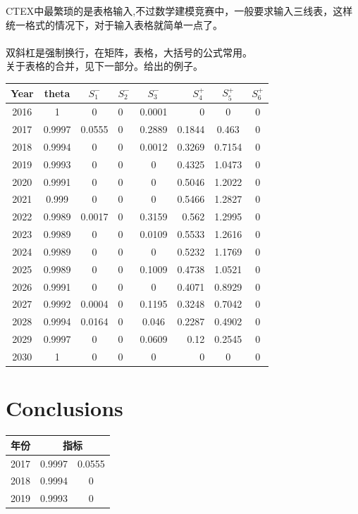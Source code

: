\documentclass{mcmthesis}
\begin{document}
CTEX中最繁琐的是表格输入,不过数学建模竞赛中，一般要求输入三线表，这样统一格式的情况下，对于输入表格就简单一点了。\\
\\
双斜杠是强制换行，在矩阵，表格，大括号的公式常用。\\
关于表格的合并，见下一部分。给出的例子。
\begin{center}
\begin{tabular}{c|cclcrcc}
\hline
Year & theta & $S_1^-$ & $S_2^-$ & $S_3^-$ & $S_4^+$ & $S_5^+$ & $S_6^+$ \\%
\hline
2016 & 1      & 0      & 0 & 0.0001 & 0      & 0      & 0 \\
2017 & 0.9997 & 0.0555 & 0 & 0.2889 & 0.1844 & 0.463  & 0 \\
2018 & 0.9994 & 0      & 0 & 0.0012 & 0.3269 & 0.7154 & 0 \\
2019 & 0.9993 & 0      & 0 & 0      & 0.4325 & 1.0473 & 0 \\
2020 & 0.9991 & 0      & 0 & 0      & 0.5046 & 1.2022 & 0 \\
2021 & 0.999  & 0      & 0 & 0      & 0.5466 & 1.2827 & 0 \\
2022 & 0.9989 & 0.0017 & 0 & 0.3159 & 0.562  & 1.2995 & 0 \\
2023 & 0.9989 & 0      & 0 & 0.0109 & 0.5533 & 1.2616 & 0 \\
2024 & 0.9989 & 0      & 0 & 0      & 0.5232 & 1.1769 & 0 \\
2025 & 0.9989 & 0      & 0 & 0.1009 & 0.4738 & 1.0521 & 0 \\
2026 & 0.9991 & 0      & 0 & 0      & 0.4071 & 0.8929 & 0 \\
2027 & 0.9992 & 0.0004 & 0 & 0.1195 & 0.3248 & 0.7042 & 0 \\
2028 & 0.9994 & 0.0164 & 0 & 0.046  & 0.2287 & 0.4902 & 0 \\
2029 & 0.9997 & 0      & 0 & 0.0609 & 0.12   & 0.2545 & 0 \\
2030 & 1      & 0      & 0 & 0      & 0      & 0      & 0 \\
\hline
\end{tabular}
\end{center}

\section{Conclusions}


\begin{center}
\begin{tabular}{c|cc}
\hline
年份 & \multicolumn{2}{c}{指标}\\
\hline
2017 & 0.9997 & 0.0555 \\
2018 & 0.9994 & 0      \\
2019 & 0.9993 & 0      \\
\hline
\end{tabular}
\end{center}
\end{document}
